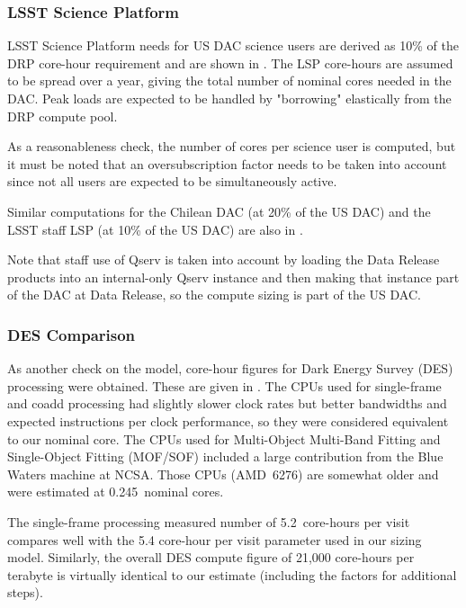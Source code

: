 \subsubsection{LSST Science Platform}

LSST Science Platform needs for US DAC science users are derived as 10\% of the DRP core-hour requirement and are shown in .
The LSP core-hours are assumed to be spread over a year, giving the total number of nominal cores needed in the DAC.
Peak loads are expected to be handled by "borrowing" elastically from the DRP compute pool.

As a reasonableness check, the number of cores per science user is computed, but it must be noted that an oversubscription factor needs to be taken into account since not all users are expected to be simultaneously active.

Similar computations for the Chilean DAC (at 20\% of the US DAC) and the LSST staff LSP (at 10\% of the US DAC) are also in .

Note that staff use of Qserv is taken into account by loading the Data Release products into an internal-only Qserv instance and then making that instance part of the DAC at Data Release, so the compute sizing is part of the US DAC.



\subsubsection{DES Comparison}

As another check on the model, core-hour figures for Dark Energy Survey (DES) processing were obtained.
These are given in .
The CPUs used for single-frame and coadd processing had slightly slower clock rates but better bandwidths and expected instructions per clock performance, so they were considered equivalent to our nominal core.
The CPUs used for Multi-Object Multi-Band Fitting and Single-Object Fitting (MOF/SOF) included a large contribution from the Blue Waters machine at NCSA.
Those CPUs (AMD~6276) are somewhat older and were estimated at 0.245~nominal cores.

The single-frame processing measured number of 5.2~core-hours per visit compares well with the 5.4 core-hour per visit parameter used in our sizing model.
Similarly, the overall DES compute figure of 21,000 core-hours per terabyte is virtually identical to our estimate (including the factors for additional steps).

